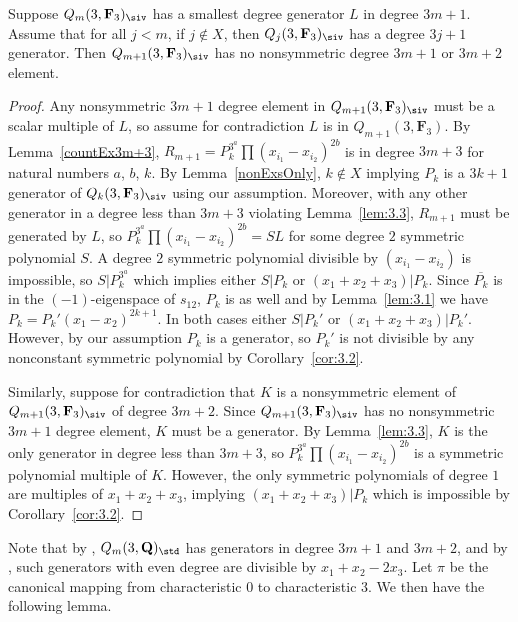 \begin{Lemma}\label{notInm+1}
 Suppose $Q_m(3,\mathbf{F}_3)_{\siv}$ has a smallest degree generator $L$ in degree $3m+1$. Assume that for all $j<m$, if $j\not\in X$, then $Q_j(3,\mathbf{F}_3)_\siv$ has a degree $3j+1$ generator. Then $Q_{m+1}(3,\mathbf{F}_3)_{\siv}$ has no nonsymmetric degree $3m+1$ or $3m+2$ element.
\end{Lemma}
\begin{proof}
 Any nonsymmetric $3m+1$ degree element in $Q_{m+1}(3,\mathbf{F}_3)_{\siv}$ must be a scalar multiple of $L$, so assume for contradiction $L$ is in $Q_{m+1}(3,\mathbf{F}_3)$. By Lemma~\ref{countEx3m+3}, $R_{m+1}=P_k^{3^a}\prod(x_{i_1}-x_{i_2})^{2b}$ is in degree $3m+3$ for natural numbers $a$, $b$, $k$. By Lemma~\ref{nonExsOnly}, $k\not\in X$ implying $P_k$ is a $3k+1$ generator of $Q_k(3,\mathbf{F}_3)_{\siv}$ using our assumption. Moreover, with any other generator in a degree less than $3m+3$ violating Lemma~\ref{lem:3.3}, $R_{m+1}$ must be generated by $L$, so $P_k^{3^a}\prod(x_{i_1}-x_{i_2})^{2b}=SL$ for some degree $2$ symmetric polynomial $S$. A degree $2$ symmetric polynomial divisible by $(x_{i_1}-x_{i_2})$ is impossible, so $S|P_k^{3^a}$ which implies either $S|P_k$ or $(x_1+x_2+x_3)|P_k$. Since $\overline{P_{k}}$ is in the $(-1)$-eigenspace of $s_{12}$, $P_{k}$ is as well and by Lemma~\ref{lem:3.1} we have $P_k=P_k'(x_1-x_2)^{2k+1}$. In both cases either $S|P_k'$ or $(x_1+x_2+x_3)|P_k'$. However, by our assumption $P_k$ is a generator, so $P_k'$ is not divisible by any nonconstant symmetric polynomial by Corollary~\ref{cor:3.2}.

 Similarly, suppose for contradiction that $K$ is a nonsymmetric element of $Q_{m+1}(3,\mathbf{F}_3)_{\siv}$ of degree $3m+2$. Since $Q_{m+1}(3,\mathbf{F}_3)_{\siv}$ has no nonsymmetric $3m+1$ degree element, $K$ must be a generator. By Lemma~\ref{lem:3.3}, $K$ is the only generator in degree less than $3m+3$, so $P_k^{3^a}\prod(x_{i_1}-x_{i_2})^{2b}$ is a symmetric polynomial multiple of $K$. However, the only symmetric polynomials of degree $1$ are multiples of $x_1+x_2+x_3$, implying $(x_1+x_2+x_3)|P_k$ which is impossible by Corollary~\ref{cor:3.2}.
\end{proof}

Note that by \cite{felder2001action}, $Q_m(3,\mathbf{Q})_{\std}$ has generators in degree $3m+1$ and $3m+2$, and by \cite{wang2022explicit}, such generators with even degree are divisible by $x_1+x_2-2x_3$. Let $\pi$ be the canonical mapping from characteristic $0$ to characteristic $3$. We then have the following lemma.


